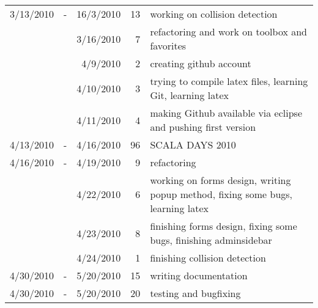 \begin{tabular}{| r c r | r | p{9cm} |}
3/13/2010	&	-	&	16/3/2010	&	13	&	working on collision detection \\
	&		&	3/16/2010	&	7	&	refactoring and work on toolbox and favorites \\
	&		&	4/9/2010	&	2	&	creating github account \\
	&		&	4/10/2010	&	3	&	trying to compile latex files, learning Git, learning latex \\
	&		&	4/11/2010	&	4	&	making Github available via eclipse and pushing first version \\
4/13/2010	&	-	&	4/16/2010	&	96	&	SCALA DAYS 2010 \\
4/16/2010	&	-	&	4/19/2010	&	9	&	refactoring \\
	&		&	4/22/2010	&	6	&	working on forms design, writing popup method, fixing some bugs, learning latex \\
	&		&	4/23/2010	&	8	&	finishing forms design, fixing some bugs, finishing adminsidebar \\
	&		&	4/24/2010	&	1	&	finishing collision detection \\
4/30/2010	&	-	&	5/20/2010	&	15	&	writing documentation \\
4/30/2010	&	-	&	5/20/2010	&	20	&	testing and bugfixing \\
\hline
\end{tabular}

